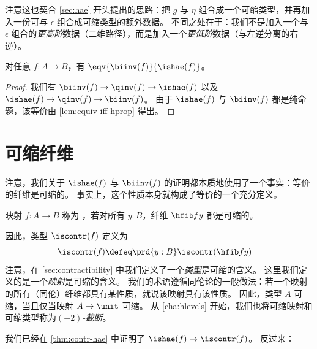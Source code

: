 注意这也契合 \cref{sec:hae} 开头提出的思路：把 $g$ 与 $\eta$ 组合成一个可缩类型，并再加入一份可与 $\epsilon$ 组合成可缩类型的额外数据。
不同之处在于：我们不是加入一个与 $\epsilon$ 组合的\emph{更高阶}数据（二维路径），而是加入一个\emph{更低阶}数据（与左逆分离的右逆）。

\begin{cor}\label{thm:equiv-biinv-isequiv}
  对任意 $f:A\to B$，有 $\eqv{\biinv(f)}{\ishae(f)}$。
\end{cor}
\begin{proof}
  我们有 $\biinv(f) \to \qinv(f) \to \ishae(f)$ 以及 $\ishae(f) \to \qinv(f) \to \biinv(f)$。
  由于 $\ishae(f)$ 与 $\biinv(f)$ 都是纯命题，该等价由 \cref{lem:equiv-iff-hprop} 得出。
\end{proof}

%
%
%

\section{可缩纤维}
\label{sec:contrf}

%
%
%

注意，我们关于 $\ishae(f)$ 与 $\biinv(f)$ 的证明都本质地使用了一个事实：等价的纤维是可缩的。
事实上，这个性质本身就构成了等价的一个充分定义。

\begin{defn}[可缩映射] \label{defn:equivalence}
  映射 $f:A\to B$ 称为
  ，若对所有 $y:B$，纤维 $\hfib f y$ 都是可缩的。
\end{defn}

因此，类型 $\iscontr(f)$ 定义为
\begin{align}
  \iscontr(f) &\defeq \prd{y:B} \iscontr(\hfib f y)\label{eq:iscontrf}
\end{align}
注意，在 \cref{sec:contractibility} 中我们定义了一个\emph{类型}是可缩的含义。
这里我们定义的是一个\emph{映射}是可缩的含义。
我们的术语遵循同伦论的一般做法：若一个映射的所有（同伦）纤维都具有某性质，就说该映射具有该性质。
因此，类型 $A$ 可缩，当且仅当映射 $A\to\unit$ 可缩。
从 \cref{cha:hlevels} 开始，我们也将可缩映射和可缩类型称为\emph{$(-2)$-截断}。

我们已经在 \cref{thm:contr-hae} 中证明了 $\ishae(f) \to \iscontr(f)$。
反过来：

